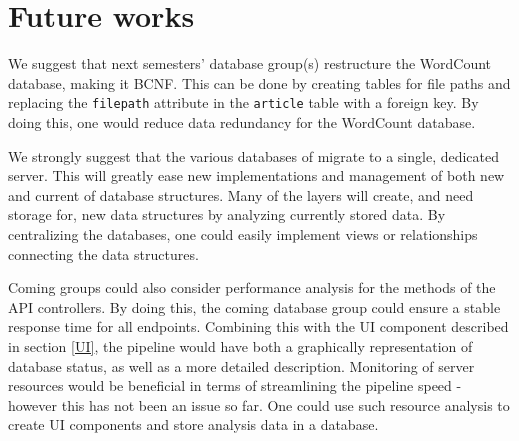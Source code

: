 \section{Future works}
We suggest that next semesters' database group(s) restructure the WordCount database, making it BCNF. 
This can be done by creating tables for file paths and replacing the \texttt{filepath} attribute in the \texttt{article} table with a foreign key.
By doing this, one would reduce data redundancy for the WordCount database. 

We strongly suggest that the various databases of \knox{} migrate to a single, dedicated server.
This will greatly ease new implementations and management of both new and current of database structures.
Many of the layers will create, and need storage for, new data structures by analyzing currently stored data.
By centralizing the \knox{} databases, one could easily implement views or relationships connecting the data structures.

Coming groups could also consider performance analysis for the methods of the API controllers. 
By doing this, the coming database group could ensure a stable response time for all endpoints.
Combining this with the UI component described in section \ref{UI}, the pipeline would have both a graphically representation of database status, as well as a more detailed description.
Monitoring of server resources would be beneficial in terms of streamlining the pipeline speed - however this has not been an issue so far.
One could use such resource analysis to create UI components and store analysis data in a database.

